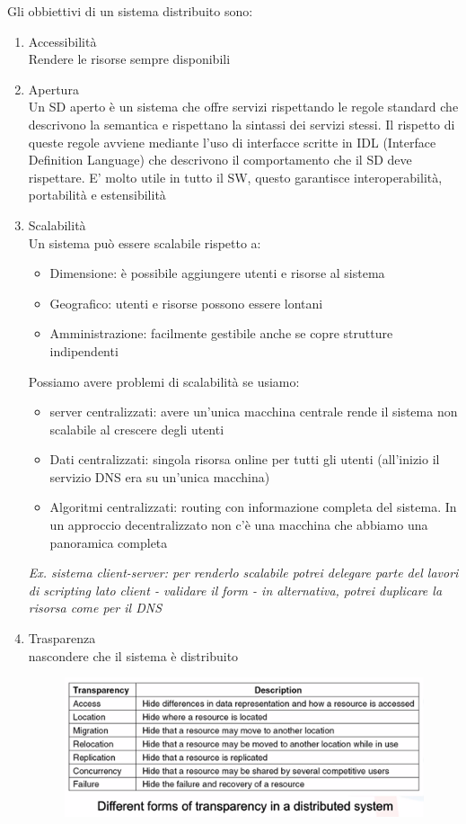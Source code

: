 \documentclass[12pt,italian]{report}
\begin{document}
\noindent Gli obbiettivi di un sistema distribuito sono:
\begin{enumerate}
    \item Accessibilità \\ Rendere le risorse sempre disponibili 
    \item Apertura \\ Un SD aperto è un sistema che offre servizi rispettando le regole standard che descrivono la semantica e rispettano la sintassi dei servizi stessi. Il rispetto di queste regole avviene mediante l'uso di interfacce scritte in IDL (Interface Definition Language) che descrivono il comportamento che il SD deve rispettare. E' molto utile in tutto il SW, questo garantisce interoperabilità, portabilità e estensibilità 
    \item Scalabilità \\ Un sistema può essere scalabile rispetto a:
    \begin{itemize}
        \item Dimensione: è possibile aggiungere utenti e risorse al sistema
        \item Geografico: utenti e risorse possono essere lontani
        \item Amministrazione: facilmente gestibile anche se copre strutture indipendenti
    \end{itemize}
    Possiamo avere problemi di scalabilità se usiamo:
    \begin{itemize}
        \item server centralizzati: avere un'unica macchina centrale rende il sistema non scalabile al crescere degli utenti
        \item Dati centralizzati: singola risorsa online per tutti gli utenti (all'inizio il servizio DNS era su un'unica macchina)
        \item Algoritmi centralizzati: routing con informazione completa del sistema. In un approccio decentralizzato non c'è una macchina che abbiamo una panoramica completa
    \end{itemize}
    \textit{Ex. sistema client-server: per renderlo scalabile potrei delegare parte del lavori di scripting lato client - validare il form - in alternativa, potrei duplicare la risorsa come per il DNS}
    \item Trasparenza \\ nascondere che il sistema è distribuito 
    \begin{figure}[h]
	\centering
    \includegraphics[width=110mm]{img/trasparenza.png}

\end{figure}
\end{enumerate}
\end{document}
